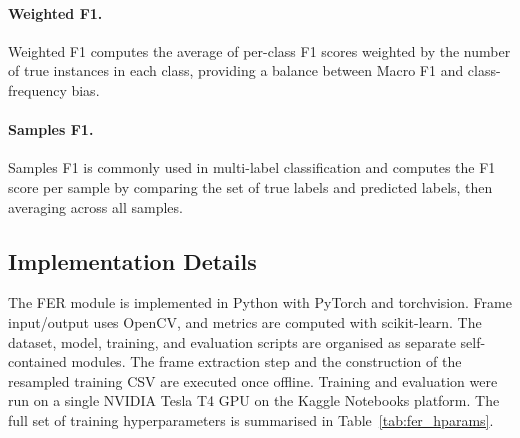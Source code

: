 \paragraph{Weighted F1.}
Weighted F1 computes the average of per-class F1 scores weighted by the number of true instances in each class, providing a balance between Macro F1 and class-frequency bias. \cite{scikit_learn}

\paragraph{Samples F1.}
Samples F1 is commonly used in multi-label classification and computes the F1 score per sample by comparing the set of true labels and predicted labels, then averaging across all samples. \cite{tsoumakas2007multi, scikit_learn}
\subsection{Implementation Details}\label{sec:method_impl}

The \ac{FER} module is implemented in Python with PyTorch and torchvision. Frame input/output uses OpenCV, and metrics are computed with scikit-learn. The dataset, model, training, and evaluation scripts are organised as separate self-contained modules. The frame extraction step and the construction of the resampled training CSV are executed once offline. Training and evaluation were run on a single NVIDIA Tesla T4 GPU on the Kaggle Notebooks platform. The full set of training hyperparameters is summarised in Table~\ref{tab:fer_hparams}.

